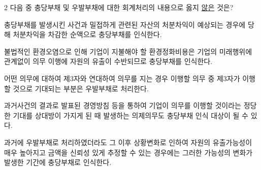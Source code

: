 \begin{question}{2}
다음 중 충당부채 및 우발부채에 대한 회계처리의 내용으로 옳지 \uline{않은} 것은?
\begin{choices}
  \item 충당부채를 발생시킨 사건과 밀접하게 관련된 자산의 처분차익이 예상되는 경우에 당해 처분차익을 차감한 순액으로 충당부채를 인식한다.
  \item 불법적인 환경오염으로 인해 기업이 지불해야 할 환경정화비용은 기업의 미래행위에 관계없이 의무 이행에 자원의 유출이 수반되므로 충당부채를 인식한다.
  \item 어떤 의무에 대하여 제3자와 연대하여 의무를 지는 경우 이행할 의무 중 제3자가 이행할 것으로 기대되는 부분은 우발부채로 처리한다.
  \item 과거사건의 결과로 발표된 경영방침 등을 통하여 기업이 의무를 이행할 것이라는 정당한 기대를 상대방이 가지게 된 때 발생하는 의제의무도 충당부채 인식 대상이 될 수 있다.
  \item 과거에 우발부채로 처리하였더라도 그 이후 상황변화로 인하여 자원의 유출가능성이 매우 높아지고 금액을 신뢰성 있게 추정할 수 있는 경우에는 그러한 가능성의 변화가 발생한 기간에 충당부채로 인식한다.
\end{choices}
\end{question}
